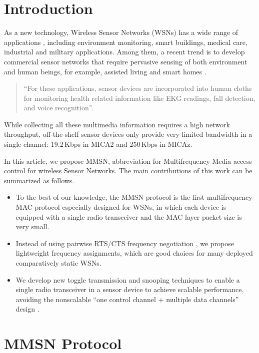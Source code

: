 
\section{Introduction}


As a new technology, Wireless Sensor Networks (WSNs) has a wide
range of applications \cite{Culler-01, Bahl-02, Akyildiz-01}, including
environment monitoring, smart buildings, medical care, industrial and
military applications. Among them, a recent trend is to develop
commercial sensor networks that require pervasive sensing of both
environment and human beings, for example, assisted living
\cite{Akyildiz-02, Harvard-01,CROSSBOW} and smart homes
\cite{Harvard-01, Adya-01,CROSSBOW}.
\begin{quote}
  ``For these applications, sensor devices are incorporated into human
  cloths \cite{Natarajan-01, Zhou-06, Bahl-02, Adya-01} for monitoring
  health related information like EKG readings, fall detection, and
  voice recognition''.
\end{quote}
While collecting all these multimedia information
\cite{Akyildiz-02} requires a high network throughput, off-the-shelf
sensor devices only provide very limited bandwidth in a single
channel: 19.2\,Kbps in MICA2 \cite{Bahl-02} and 250\,Kbps in MICAz.

In this article, we propose MMSN, abbreviation for Multifrequency
Media access control for wireless Sensor Networks. The main
contributions of this work can be summarized as follows.
\begin{itemize}
\item To the best of our knowledge, the MMSN protocol is the first
multifrequency MAC protocol especially designed for WSNs, in which
each device is equipped with a single radio transceiver and
the MAC layer packet size is very small.
\item Instead of using pairwise RTS/CTS frequency negotiation
\cite{Adya-01, Culler-01, Tzamaloukas-01, Zhou-06},
we propose lightweight frequency assignments, which are good choices
for many deployed comparatively static WSNs.
\item We develop new toggle transmission and snooping techniques to
enable a single radio transceiver in a sensor device to achieve
scalable performance, avoiding the nonscalable ``one
control channel + multiple data channels'' design \cite{Natarajan-01}.
\end{itemize}

\section{MMSN Protocol}

